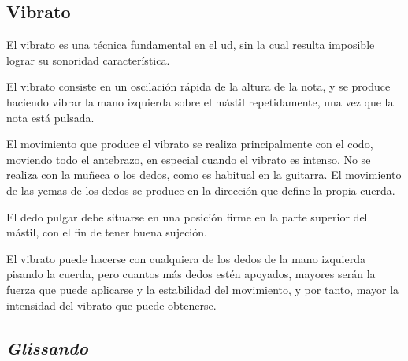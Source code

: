 \begin{center}
\end{center}




\subsection{Vibrato}

El vibrato es una técnica fundamental en el ud, sin la cual resulta imposible lograr su sonoridad característica.

El vibrato consiste en un oscilación rápida de la altura de la nota, y se produce haciendo vibrar la mano izquierda sobre el mástil repetidamente, una vez que la nota está pulsada.

El movimiento que produce el vibrato se realiza principalmente con el codo, moviendo todo el antebrazo, en especial cuando el vibrato es intenso. No se realiza con la muñeca o los dedos, como es habitual en la guitarra. El movimiento de las yemas de los dedos se produce en la dirección que define la propia cuerda.

El dedo pulgar debe situarse en una posición firme en la parte superior del mástil, con el fin de tener buena sujeción.

El vibrato puede hacerse con cualquiera de los dedos de la mano izquierda pisando la cuerda, pero cuantos más dedos estén apoyados, mayores serán la fuerza que puede aplicarse y la estabilidad del movimiento, y por tanto, mayor la intensidad del vibrato que puede obtenerse.


\begin{center}
\end{center}



\subsection{\emph{Glissando}}

